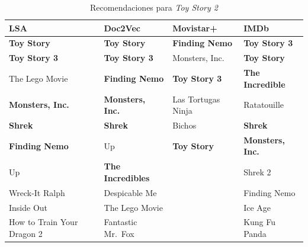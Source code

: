 \documentclass[withindex, glossary]{cam-thesis}
\begin{document}
\begin{table}
    \begin{tabularx}{\textwidth}{XXXX}
        \toprule
        \hiderowcolors{}LSA & Doc2Vec & Movistar+ & IMDb\\
        \midrule
        \showrowcolors{}\textbf{Toy Story} & \textbf{Toy Story} & \textbf{Finding Nemo} & \textbf{Toy Story 3}\\
        \textbf{Toy Story 3} & \textbf{Toy Story 3} & Monsters, Inc. & \textbf{Toy Story}\\
        The Lego Movie & \textbf{Finding Nemo} & \textbf{Toy Story 3} & \textbf{The Incredible}\\
        \textbf{Monsters, Inc.} & \textbf{Monsters, Inc.} & Las Tortugas Ninja & Ratatouille\\
        \textbf{Shrek} & \textbf{Shrek} & Bichos & \textbf{Shrek}\\
        \textbf{Finding Nemo} & Up & \textbf{Toy Story} & \textbf{Monsters, Inc.}\\
        Up & \textbf{The Incredibles} & & Shrek 2\\
        Wreck-It Ralph & Despicable Me & & Finding Nemo\\
        Inside Out & The Lego Movie & & Ice Age\\
        How to Train Your Dragon 2 & Fantastic Mr.\ Fox & & Kung Fu Panda\\
        \bottomrule
    \end{tabularx}
    \caption{Recomendaciones para \textit{Toy Story 2}}
\end{table}
\end{document}
